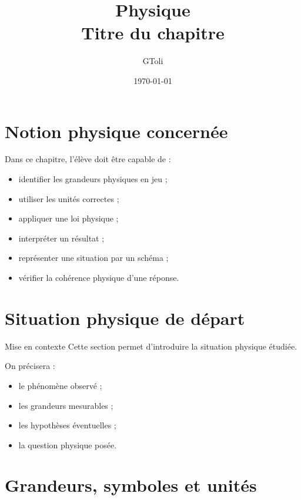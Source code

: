 \documentclass[11pt,a4paper]{article}
\title{\textbf{Physique}\\[0.2cm]
\large Titre du chapitre}
\author{GToli}
\date{\today}
\begin{document}
\maketitle

\section{Notion physique concernée}

\begin{cadreobjectif}
Dans ce chapitre, l’élève doit être capable de :
\begin{itemize}
    \item identifier les grandeurs physiques en jeu ;
    \item utiliser les unités correctes ;
    \item appliquer une loi physique ;
    \item interpréter un résultat ;
    \item représenter une situation par un schéma ;
    \item vérifier la cohérence physique d’une réponse.
\end{itemize}
\end{cadreobjectif}

\section{Situation physique de départ}

\begin{cadrebleu}{Mise en contexte}
Cette section permet d’introduire la situation physique étudiée.

\medskip

On précisera :
\begin{itemize}
    \item le phénomène observé ;
    \item les grandeurs mesurables ;
    \item les hypothèses éventuelles ;
    \item la question physique posée.
\end{itemize}
\end{cadrebleu}

\section{Grandeurs, symboles et unités}
\end{document}
